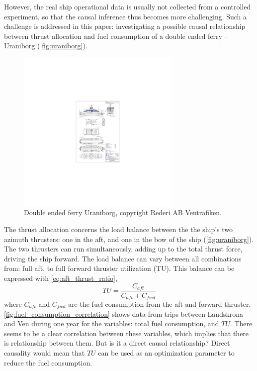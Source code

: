 However, the real ship operational data is usually not collected from a controlled experiment, so that the causal inference thus becomes more challenging. Such a challenge is addressed in this paper: investigating a possible causal relationship between thrust allocation and fuel consumption of a double ended ferry -- Uraniborg (\autoref{fig:uraniborg}).
\begin{figure}[!htb]
    \centering
    \includegraphics[width=0.7\textwidth]{figures/GA_uraniborg.pdf}
    \caption{Double ended ferry Uraniborg, copyright Rederi AB Ventrafiken.}
    \label{fig:uraniborg}
\end{figure}
The thrust allocation concerns the load balance between the the ship's two azimuth thrusters: one in the aft, and one in the bow of the ship (\autoref{fig:uraniborg}). The two thrusters can run simultaneously, adding up to the total thrust force, driving the ship forward. The load balance can vary between all combinations from: full aft, to full forward thruster utilization (TU). This balance can be expressed with \autoref{eq:aft_thrust_ratio},
\begin{equation}
    TU = \frac{C_{aft}}{C_{aft} + C_{fwd}}
    \label{eq:aft_thrust_ratio}
\end{equation}
where $C_{aft}$ and $C_{fwd}$ are the fuel consumption from the aft and forward thruster.
\autoref{fig:fuel_consumption_correlation} shows data from trips between Landskrona and Ven during one year for the variables: total fuel consumption, and $TU$. There seems to be a clear correlation between these variables,  which implies that there is relationship between them. But is it a direct causal relationship? Direct causality would mean that $TU$ can be used as an optimization parameter to reduce the fuel consumption.

